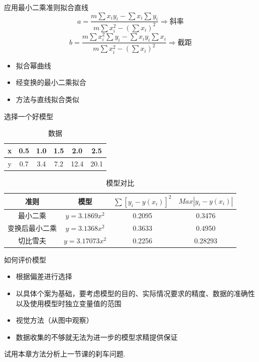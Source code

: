 \documentclass[UTF8]{ctexbeamer}
\begin{document}
\begin{frame}{应用最小二乘准则拟合直线}
  \[
  a = \frac{m\sum x_iy_i - \sum x_i\sum y_i}{m\sum x_i^2 -(\sum x_i)^2} \Rightarrow \text{斜率}
  \]
  \[
  b = \frac{m\sum x_i^2\sum y_i - \sum x_iy_i\sum x_i}{m\sum x_i^2 -(\sum x_i)^2} \Rightarrow \text{截距}
  \]

  \begin{itemize}
  \item 拟合幂曲线
  \item 经变换的最小二乘拟合
  \item 方法与直线拟合类似
  \end{itemize}
  
\end{frame}

\begin{frame}{选择一个好模型}

  \begin{table}
    \centering{}
    \begin{tabular}{c|ccccc}
      x & 0.5 & 1.0 & 1.5 & 2.0 & 2.5\\
      \hline{}
      y & 0.7 & 3.4 & 7.2 & 12.4 & 20.1
    \end{tabular}
    \caption{数据}
  \end{table}

  \begin{table}
    \centering{}
    \begin{tabular}{cccc}
      准则 & 模型 & $\sum{}[y_i - y(x_i)]^2$ & $Max |y_i - y(x_i) |$\\
      \hline{}
      最小二乘 & $y=3.1869x^2$ & 0.2095 & 0.3476\\
      变换后最小二乘 & $y=3.1368x^2$ & 0.3633 & 0.4950\\
      切比雪夫 & $y=3.17073x^2$ & 0.2256 & 0.28293
    \end{tabular}
    \caption{模型对比}
  \end{table}

\end{frame}

\begin{frame}{如何评价模型}
  \begin{itemize}
  \item 根据偏差进行选择
  \item 以具体个案为基础，要考虑模型的目的、实际情况要求的精度、数据的准确性以及使用模型时独立变量值的范围
  \item 视觉方法（从图中观察）
  \item 数据收集的不够就无法为进一步的模型求精提供保证
  \end{itemize}

  试用本章方法分析上一节课的刹车问题.

\end{frame}
\end{document}
